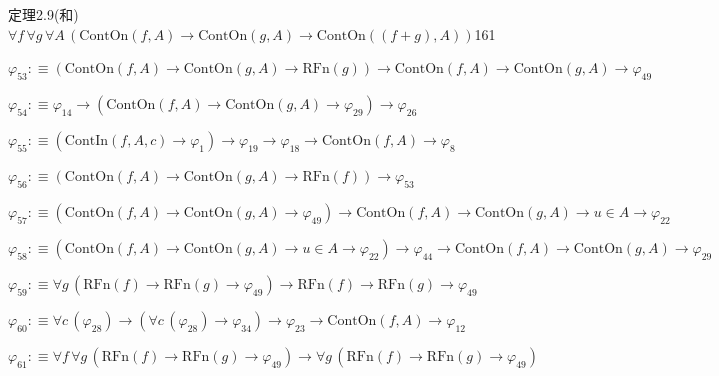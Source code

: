 \begin{fullproof}{定理2.9(和)}{$\forall f\,\forall g\,\forall A\,(\mathrm{ContOn}(f,A) \to \mathrm{ContOn}(g,A) \to \mathrm{ContOn}((f + g),A))$}{161}
\begin{abbrevlist}
\item $\varphi_{53} :\equiv (\mathrm{ContOn}(f,A) \to \mathrm{ContOn}(g,A) \to \mathrm{RFn}(g)) \to \mathrm{ContOn}(f,A) \to \mathrm{ContOn}(g,A) \to \varphi_{49}$
\item $\varphi_{54} :\equiv \varphi_{14} \to (\mathrm{ContOn}(f,A) \to \mathrm{ContOn}(g,A) \to \varphi_{29}) \to \varphi_{26}$
\item $\varphi_{55} :\equiv (\mathrm{ContIn}(f,A,c) \to \varphi_{1}) \to \varphi_{19} \to \varphi_{18} \to \mathrm{ContOn}(f,A) \to \varphi_{8}$
\item $\varphi_{56} :\equiv (\mathrm{ContOn}(f,A) \to \mathrm{ContOn}(g,A) \to \mathrm{RFn}(f)) \to \varphi_{53}$
\item $\varphi_{57} :\equiv (\mathrm{ContOn}(f,A) \to \mathrm{ContOn}(g,A) \to \varphi_{49}) \to \mathrm{ContOn}(f,A) \to \mathrm{ContOn}(g,A) \to u \in A \to \varphi_{22}$
\item $\varphi_{58} :\equiv (\mathrm{ContOn}(f,A) \to \mathrm{ContOn}(g,A) \to u \in A \to \varphi_{22}) \to \varphi_{44} \to \mathrm{ContOn}(f,A) \to \mathrm{ContOn}(g,A) \to \varphi_{29}$
\item $\varphi_{59} :\equiv \forall g\,(\mathrm{RFn}(f) \to \mathrm{RFn}(g) \to \varphi_{49}) \to \mathrm{RFn}(f) \to \mathrm{RFn}(g) \to \varphi_{49}$
\item $\varphi_{60} :\equiv \forall c\,(\varphi_{28}) \to (\forall c\,(\varphi_{28}) \to \varphi_{34}) \to \varphi_{23} \to \mathrm{ContOn}(f,A) \to \varphi_{12}$
\item $\varphi_{61} :\equiv \forall f\,\forall g\,(\mathrm{RFn}(f) \to \mathrm{RFn}(g) \to \varphi_{49}) \to \forall g\,(\mathrm{RFn}(f) \to \mathrm{RFn}(g) \to \varphi_{49})$
\end{abbrevlist}
\end{fullproof}
